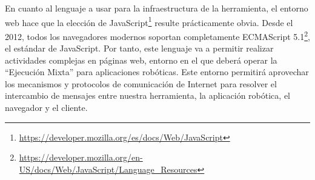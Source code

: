 En cuanto al lenguaje a usar para la infraestructura de la herramienta, el entorno web hace que la elección de JavaScript\footnote{\url{https://developer.mozilla.org/es/docs/Web/JavaScript}} resulte prácticamente obvia. Desde el 2012, todos los navegadores modernos soportan completamente ECMAScript 5.1\footnote{\url{https://developer.mozilla.org/en-US/docs/Web/JavaScript/Language_Resources}}, el estándar de JavaScript. Por tanto, este lenguaje va a permitir realizar actividades complejas en páginas web, entorno en el que deberá operar la ``Ejecución Mixta'' para aplicaciones robóticas. Este entorno permitirá aprovechar los mecanismos y protocolos de comunicación de Internet para resolver el intercambio de mensajes entre nuestra herramienta, la aplicación robótica, el navegador y el cliente.
